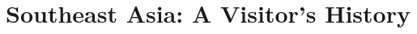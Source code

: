 \documentclass[pagesize=auto,bibliography=totocnumbered]{scrbook}
\title{Southeast Asia: A Visitor's History}
\begin{document}


\nextpage

\tableofcontents

 

\backmatter

\nextpage



\end{document}

